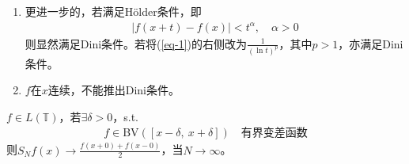 \begin{remark} 
    \begin{enumerate}
        \item 更进一步的，若满足Hölder条件，即
    \begin{align}
        |f(x+t) - f(x)| < t^{\alpha},\quad \alpha>0 \label{eq-1}
    \end{align}
    则显然满足Dini条件。若将(\ref{eq-1})的右侧改为$\frac{1}{(\ln t)^p}$，其中$p>1$，亦满足Dini条件。
    \item $f$在$x$连续，不能推出Dini条件。
    \end{enumerate}
\end{remark}



\begin{theorem}
    $f\in L(\mathbb{T})$，若$\exists \delta > 0$，s.t.
    \begin{align*}
        f\in \text{BV}([x-\delta,\ x+\delta]) \quad \text{有界变差函数}
    \end{align*}
    则$S_N f(x) \to \frac{f(x+0) + f(x-0)}{2}$，当$N\to\infty$。
\end{theorem}
